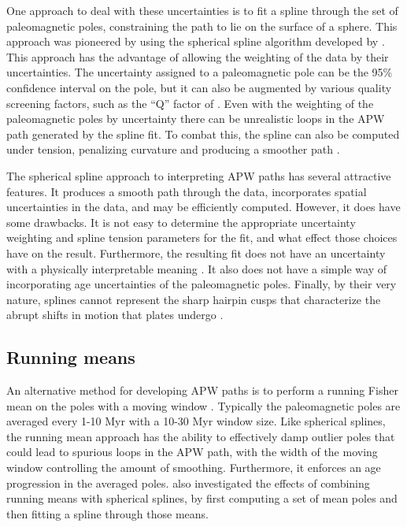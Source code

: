 \documentclass[preprint,12pt,authoryear]{elsarticle}
\begin{document}
One approach to deal with these uncertainties is to fit a spline through the
set of paleomagnetic poles, constraining the path to lie on the surface of a sphere.
This approach was pioneered by \citet{torsvik1992baltica} using the spherical spline
algorithm developed by \citet{jupp1987fitting}.
This approach has the advantage of allowing the weighting of the data by their
uncertainties. The uncertainty assigned to a paleomagnetic pole can
be the 95\% confidence interval on the pole, but it can also be augmented
by various quality screening factors, such as the ``Q'' factor of \citet{van1990reliability} \citep{torsvik1992baltica}. 
Even with the weighting of the paleomagnetic poles by uncertainty there
can be unrealistic loops in the APW path generated by the spline fit.
To combat this, the spline can also be computed under tension, penalizing
curvature and producing a smoother path \citep{torsvik1996continental}.

The spherical spline approach to interpreting APW paths has several attractive features.
It produces a smooth path through the data, incorporates spatial uncertainties
in the data, and may be efficiently computed.
However, it does have some drawbacks.
It is not easy to determine the appropriate uncertainty weighting and spline
tension parameters for the fit, and what effect those choices have on the result.
Furthermore, the resulting fit does not have an uncertainty with a physically
interpretable meaning \citep{torsvik1996continental}.
It also does not have a simple way of incorporating age uncertainties of the paleomagnetic poles.
Finally, by their very nature, splines cannot represent the sharp hairpin cusps
that characterize the abrupt shifts in motion that plates undergo \citep{irving1972hairpins, gordon1984paleomagnetic}.

\subsection{Running means}
\label{sec:running_means}
An alternative method for developing APW paths is to perform a running Fisher
mean on the poles with a moving window \citep{van2001evidence, torsvik2008global}.
Typically the paleomagnetic poles are averaged every 1-10 Myr with a 10-30 Myr
window size. Like spherical splines, the running mean approach has the ability
to effectively damp outlier poles that could lead to spurious loops in the APW path, with the width
of the moving window controlling the amount of smoothing.
Furthermore, it enforces an age progression in the averaged poles.
\citet{torsvik2008global} also investigated the effects of combining running means
with spherical splines, by first computing a set of mean poles and then
fitting a spline through those means.
\end{document}
